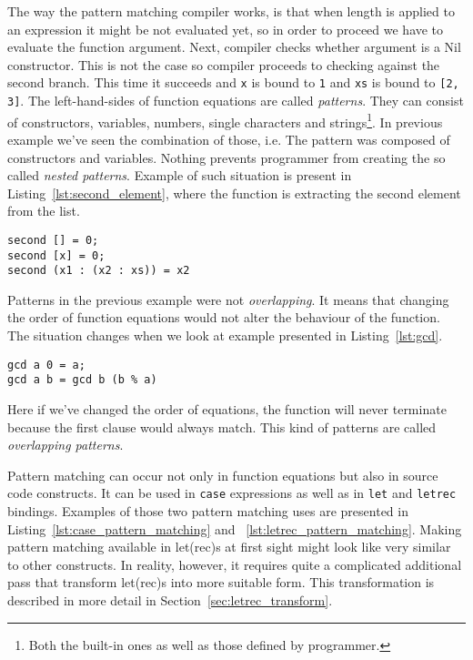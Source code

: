 \documentclass[12pt,a4paper]{report}
\begin{document}
The way the pattern matching compiler works, is that when length is applied to
an expression it might be not evaluated yet, so in order to proceed we have to
evaluate the function argument. Next, compiler checks whether argument is a Nil
constructor. This is not the case so compiler proceeds to checking against the
second branch. This time it succeeds and \texttt{x} is bound to \texttt{1} and
\texttt{xs} is bound to \texttt{[2, 3]}. The left-hand-sides of function
equations are called \textit{patterns}. They can consist of constructors,
variables, numbers, single characters and strings\footnote{Both the built-in
ones as well as those defined by programmer.}. In previous example we've seen
the combination of those, i.e. The pattern was composed of constructors and
variables. Nothing prevents programmer from creating the so called
\textit{nested patterns}. Example of such situation is present in
Listing~\ref{lst:second_element}, where the function is extracting the second
element from the list.

\hspace*{-1.5in}
\begin{lstlisting}[style=haskell,label=lst:second_element,caption={Greatest common divisor.}]
second [] = 0;
second [x] = 0;
second (x1 : (x2 : xs)) = x2
\end{lstlisting}

Patterns in the previous example were not \textit{overlapping}. It
means that changing the order of function equations would not alter the
behaviour of the function. The situation changes when we look at example
presented in Listing~\ref{lst:gcd}.

\hspace*{-1.5in}
\begin{lstlisting}[style=haskell,label=lst:gcd,caption={Greatest common divisor.}]
gcd a 0 = a;
gcd a b = gcd b (b % a)
\end{lstlisting}

Here if we've changed the order of equations, the function will never terminate
because the first clause would always match. This kind of patterns are called
\textit{overlapping patterns}.

Pattern matching can occur not only in function equations but also in source
code constructs. It can be used in \texttt{case} expressions as well as in
\texttt{let} and \texttt{letrec} bindings. Examples of those two pattern
matching uses are presented in Listing~\ref{lst:case_pattern_matching} and
~\ref{lst:letrec_pattern_matching}.  Making pattern matching available in
let(rec)s at first sight might look like very similar to other constructs. In
reality, however, it requires quite a complicated additional pass that
transform let(rec)s into more suitable form.  This transformation is described
in more detail in Section~\ref{sec:letrec_transform}.
\end{document}

